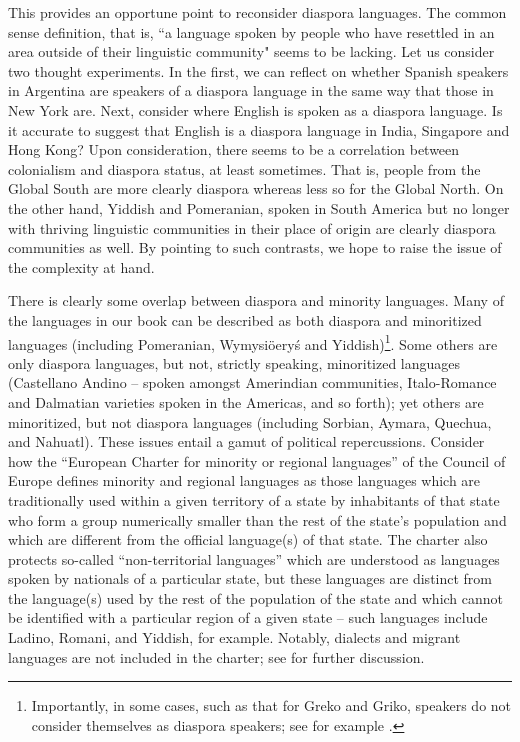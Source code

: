 \documentclass[output=paper]{langscibook}
\begin{document}
This provides an opportune point to reconsider diaspora languages. The common sense definition, that is, ``a language spoken by people who have resettled in an area outside of their linguistic community" seems to be lacking. Let us consider two thought experiments. In the first, we can reflect on whether Spanish speakers in Argentina are speakers of a diaspora language in the same way that those in New York are. Next, consider where English is spoken as a diaspora language. Is it accurate to suggest that English is a diaspora language in India, Singapore and Hong Kong? Upon consideration, there seems to be a correlation between colonialism and diaspora status, at least sometimes. That is, people from the Global South are more clearly diaspora whereas less so for the Global North. On the other hand, Yiddish and Pomeranian, spoken in South America but no longer with thriving linguistic communities in their place of origin are clearly diaspora communities as well. By pointing to such contrasts, we hope to raise the issue of the complexity at hand.

There is clearly some overlap between diaspora and minority languages. Many of the languages in our book can be described as both diaspora and minoritized languages (including Pomeranian, Wymysiöeryś and Yiddish)\footnote{Importantly, in some cases, such as that for  Greko and Griko, speakers do not consider themselves as diaspora speakers; see for example \citet{Pellegrino2021}.}. Some others are only diaspora languages, but not, strictly speaking, minoritized languages (Castellano Andino -- spoken amongst Amerindian communities, Italo-Romance and Dalmatian varieties spoken in the Americas, and so forth); yet others are minoritized, but not diaspora languages (including Sorbian, Aymara, Quechua, and Nahuatl). These issues entail a gamut of political repercussions. Consider how the ``European Charter for minority or regional languages'' of the Council of Europe defines minority and regional languages as those languages which are traditionally used within a given territory of a state by inhabitants of that state who form a group numerically smaller than the rest of the state’s population and which are different from the official language(s) of that state. The charter also protects so-called ``non-territorial languages'' which are understood as languages spoken by nationals of a particular state, but these languages are distinct from the language(s) used by the rest of the population of the state and which cannot be identified with a particular region of a given state -- such languages include Ladino, Romani, and Yiddish, for example. Notably, dialects and migrant languages are not included in the charter; see \citet{woehrling2005european} for further discussion.
\end{document}
